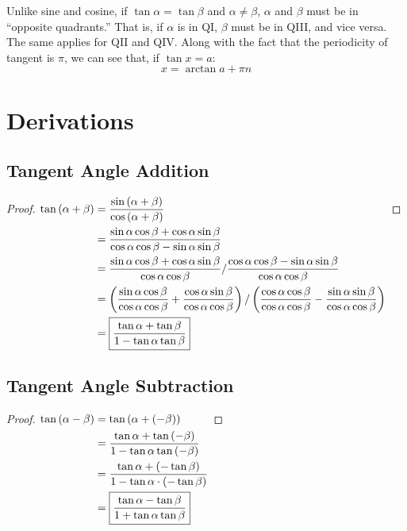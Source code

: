 \documentclass{article}
\begin{document}
Unlike sine and cosine, if $\tan\alpha=\tan\beta$ and $\alpha\neq
\beta$, $\alpha$ and $\beta$ must be in ``opposite quadrants.'' That
is, if $\alpha$ is in QI, $\beta$ must be in QIII, and vice versa.
The same applies for QII and QIV. Along with the fact that the
periodicity of tangent is $\pi$, we can see that, if $\tan x=a$:
\begin{equation*}
	\boxed{x=\arctan a+\pi n}
\end{equation*}











\newpage
\section{Derivations}

\subsection{Tangent Angle Addition}
\label{proof:tanadd}
\begin{proof}
	$\begin{aligned}[t]
		\tan\left(\alpha+\beta\right)
		&=\frac{\sin\left(\alpha+\beta\right)}
			 {\cos\left(\alpha+\beta\right)} \\
		&=\frac{\sin\alpha\cos\beta+\cos\alpha\sin\beta}
			 {\cos\alpha\cos\beta-\sin\alpha\sin\beta} \\
		&=\frac{\sin\alpha\cos\beta+\cos\alpha\sin\beta}{\cos\alpha\cos\beta}/
		\frac{\cos\alpha\cos\beta-\sin\alpha\sin\beta}{\cos\alpha\cos\beta} \\
		&=\left(\frac{\sin\alpha\cos\beta}{\cos\alpha\cos\beta}+
		\frac{\cos\alpha\sin\beta}{\cos\alpha\cos\beta}\right)/
		\left(\frac{\cos\alpha\cos\beta}{\cos\alpha\cos\beta}-
		\frac{\sin\alpha\sin\beta}{\cos\alpha\cos\beta}\right) \\
		&=\boxed{\frac{\tan\alpha+\tan\beta}{1-\tan\alpha\tan\beta}} \\
	\end{aligned} \\$
\end{proof}

\subsection{Tangent Angle Subtraction}
\label{proof:tansub}
\begin{proof}
	$\begin{aligned}[t]
		\tan\left(\alpha-\beta\right)
		&=\tan\left(\alpha+\left(-\beta\right)\right) \\
		&=\frac{\tan\alpha+\tan\left(-\beta\right)}
			 {1-\tan\alpha\tan\left(-\beta\right)} \\
		&=\frac{\tan\alpha+\left(-\tan\beta\right)}
			 {1-\tan\alpha\cdot\left(-\tan\beta\right)} \\
		&=\boxed{\frac{\tan\alpha-\tan\beta}{1+\tan\alpha\tan\beta}} \\
	\end{aligned} \\$
\end{proof}
\end{document}
